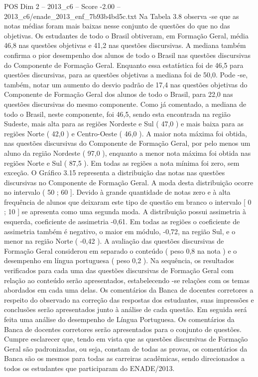 \begin{textsample}{POS Dim 2 – 2013\_c6 – Score -2.00 – 2013\_c6/enade\_2013\_enf\_7b93b4bd5c.txt}
Na Tabela 3.8 observa -se que as notas médias foram mais baixas nesse conjunto de questões do que no das objetivas.
Os estudantes de todo o Brasil obtiveram, em Formação Geral, média 46,8 nas questões objetivas e 41,2 nas questões discursivas.
A mediana também confirma o pior desempenho dos alunos de todo o Brasil nas questões discursivas do Componente de Formação Geral.
Enquanto essa estatística foi de 46,5 para questões discursivas, para as questões objetivas a mediana foi de 50,0.
Pode -se, também, notar um aumento do desvio padrão de 17,4 nas questões objetivas do Componente de Formação Geral dos alunos de todo o Brasil, para 22,0 nas questões discursivas do mesmo componente.
Como já comentado, a mediana de todo o Brasil, neste componente, foi 46,5, sendo esta encontrada na região Sudeste, mais alta para as regiões Nordeste e Sul ( 47,0 ) e mais baixa para as regiões Norte ( 42,0 ) e Centro-Oeste ( 46,0 ).
A maior nota máxima foi obtida, nas questões discursivas do Componente de Formação Geral, por pelo menos um aluno da região Nordeste ( 97,0 ), enquanto a menor nota máxima foi obtida nas regiões Norte e Sul ( 87,5 ).
Em todas as regiões a nota mínima foi zero, sem exceção.
O Gráfico 3.15 representa a distribuição das notas nas questões discursivas no Componente de Formação Geral.
A moda desta distribuição ocorre no intervalo ( 50 ; 60 ].
Devido à grande quantidade de notas zero e à alta frequência de alunos que deixaram este tipo de questão em branco o intervalo [ 0 ; 10 ] se apresenta como uma segunda moda.
A distribuição possui assimetria à esquerda, coeficiente de assimetria -0,61.
Em todas as regiões o coeficiente de assimetria também é negativo, o maior em módulo, -0,72, na região Sul, e o menor na região Norte ( -0,42 ).
A avaliação das questões discursivas de Formação Geral considerou em separado o conteúdo ( peso 0,8 na nota ) e o desempenho em língua portuguesa ( peso 0,2 ).
Na sequência, os resultados verificados para cada uma das questões discursivas de Formação Geral com relação ao conteúdo serão apresentados, estabelecendo -se relações com os temas abordados em cada uma delas.
Os comentários da Banca de docentes corretores a respeito do observado na correção das respostas dos estudantes, suas impressões e conclusões serão apresentados junto à análise de cada questão.
Em seguida será feita uma análise do desempenho de Língua Portuguesa.
Os comentários da Banca de docentes corretores serão apresentados para o conjunto de questões.
Cumpre esclarecer que, tendo em vista que as questões discursivas de Formação Geral são padronizadas, ou seja, constam de todas as provas, os comentários da Banca são os mesmos para todas as carreiras acadêmicas, sendo direcionados a todos os estudantes que participaram do ENADE/2013.

\end{textsample}
